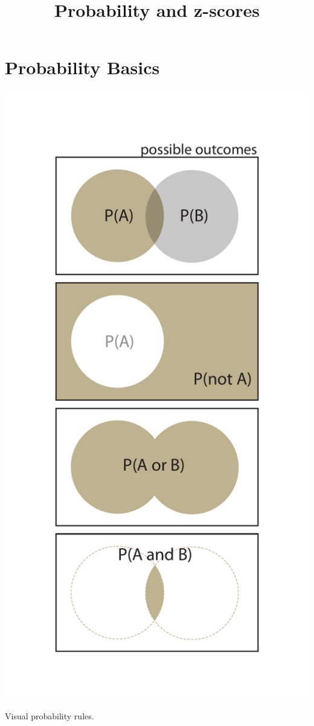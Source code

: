 \documentclass{tufte-handout}
\title{Probability and z-scores}
\date{} %
\begin{document}
\maketitle%



\section{Probability Basics}
\begin{marginfigure}
  \includegraphics[width=\linewidth]{images/handout2_probability}%
  \label{fig:fullfig}%
  \caption{Visual probability rules.}
\end{marginfigure}
\end{document}
